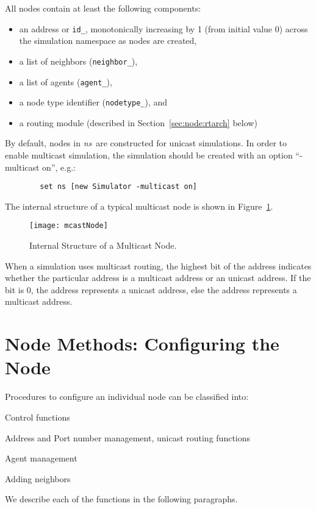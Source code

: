 All nodes contain at least the following components:
\begin{itemize}
\item an address or {\tt id\_}, monotonically increasing by 1 (from 
initial value 0) across the simulation namespace as nodes are created,
\item a list of neighbors ({\tt neighbor\_}),
\item a list of agents ({\tt agent\_}),
\item a node type identifier ({\tt nodetype\_}), and
\item a routing module (described in Section~\ref{sec:node:rtarch} below)
\end{itemize}


By default, nodes in \emph{ns}\ are constructed for unicast simulations.
In order to enable multicast simulation, the simulation should be created 
with an option ``-multicast on'', e.g.:
\begin{verbatim}
        set ns [new Simulator -multicast on]
\end{verbatim}
The internal structure of a typical multicast node is shown in
Figure~\ref{fig:node:multicast}.
\begin{figure}
  \centerline{\texttt{[image: mcastNode]}}
  \caption{Internal Structure of a Multicast Node.}
  \label{fig:node:multicast}
\end{figure}

When a simulation uses multicast routing,
the highest bit of the address indicates whether the particular
address is a multicast address or an unicast address.
If the bit is 0, the address represents a unicast address,
else the address represents a multicast address.

\section{Node Methods: Configuring the Node}
\label{sec:node:node}

Procedures to configure an individual node can be classified into:
\begin{list}{---}{\itemsep0pt}
\item Control functions
\item Address and Port number management, unicast routing functions
\item Agent management
\item Adding neighbors
\end{list}
We describe each of the functions in the following paragraphs.

